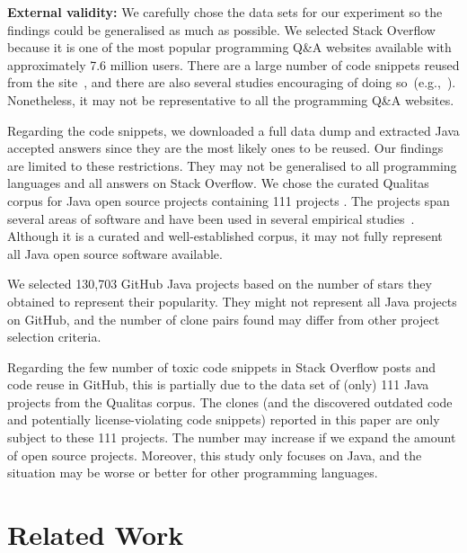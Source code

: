 \documentclass[10pt,journal,compsoc]{IEEEtran}
\begin{document}
\textbf{External validity:} We carefully chose the data sets for our
experiment so the findings could be generalised as much as possible.
We selected Stack Overflow because it is one of the most popular
programming Q\&A websites available with approximately 7.6 million
users. There are a large number of code snippets reused from the
site~\cite{An2017}, and there are also several studies encouraging of
doing
so~(e.g.,~\cite{Ponzanelli2013,Ponzanelli2014,Keivanloo2014,Park2014}).
Nonetheless, it may not be representative to all the programming Q\&A
websites.

Regarding the code snippets, we downloaded a full data dump and extracted Java
accepted answers since they are the most likely ones to be reused. Our findings
are limited to these restrictions. They may not be generalised to all
programming languages and all answers on Stack Overflow. We chose the curated
Qualitas corpus for Java open source projects containing 111 projects
\cite{QualitasCorpus}. 
The projects span several areas of software and have been used in several empirical
studies~\cite{Taube-Schock2011,Beckman2011,Vasilescu2011,Omar2012}. Although it
is a curated and well-established corpus, it may not fully represent all Java
open source software available. 

We selected 130,703 GitHub Java projects
based on the number of stars they obtained to represent their popularity. They
might not represent all Java projects on GitHub, and the number of clone pairs
found may differ from other project selection criteria.

Regarding the few number of toxic code snippets in Stack Overflow posts and code reuse in
GitHub, this is partially due to the data set of (only) 111 Java projects from
the Qualitas corpus. The clones (and the discovered outdated code and
potentially license-violating code snippets) reported in this paper are only
subject to these 111 projects. The number may increase if we expand the amount
of open source projects. Moreover, this study only focuses on Java, and the
situation may be worse or better for other programming languages.

\section{Related Work}
\end{document}
